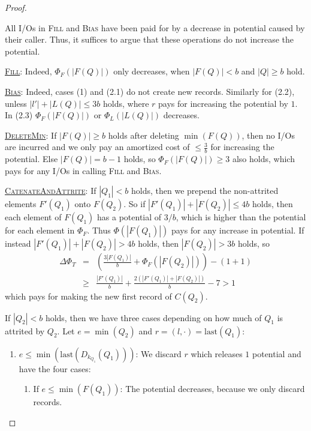 \documentclass{sig-alternate}
\newcommand{\last}{\text{last}}
\renewcommand{\(}{\left(}
\renewcommand{\)}{\right)}
\begin{document}
\begin{proof}
\begin{confenv}
All I/Os in \textsc{Fill} and \textsc{Bias} have been paid for by a decrease in
potential caused by their caller. Thus, it suffices to argue that these
operations do not increase the potential.

\noindent \underline{\textsc{Fill}}: Indeed, $\Phi_F(|F(Q)|)$ only decreases,
when $|F(Q)| < b$ and $|Q| \geq b$ hold.

\noindent \underline{\textsc{Bias}}: Indeed, cases (1) and (2.1) do not create
new records.  Similarly for (2.2), unless $|l'| + |L(Q)| \leq 3b$ holds, where
$r$ pays for increasing the potential by $1$.  In (2.3) $\Phi_F(|F(Q)|)$ or
$\Phi_L(|L(Q)|)$ decreases.
\end{confenv}
\begin{fullenv}

\noindent \underline{\textsc{DeleteMin}}: If $|F(Q)| \geq b$ holds after
deleting $\min(F(Q))$, then no I/Os are incurred and we only pay an amortized
cost of $\leq \frac{3}{b}$ for increasing the potential. Else $|F(Q)| = b-1$
holds, so $\Phi_F(|F(Q)|) \geq 3$ also holds, which pays for any I/Os in calling
\textsc{Fill} and \textsc{Bias}.

\noindent \underline{\textsc{CatenateAndAttrite}}: If $|Q_1| < b$ holds, then we
prepend the non-attrited elements $F'(Q_1)$ onto $F(Q_2)$. So if $|F'(Q_1)| +
|F(Q_2)| \leq 4b$ holds, then each element of $F(Q_1)$ has a potential of $3/b$,
which is higher than the potential for each element in $\Phi_F$. Thus
$\Phi(|F(Q_1)|)$ pays for any increase in potential. If instead $|F'(Q_1)| +
|F(Q_2)| > 4b$ holds, then $|F(Q_2)| > 3b$ holds, so
\begin{eqnarray*}
  \Delta \Phi_T
    &=&
  \( \frac{3|F(Q_1)|}{b} + \Phi_F(|F(Q_2)|) \) - \( 1+1 \) \\
    &\geq&
  \frac{|F'(Q_1)|}{b} + \frac{2(|F'(Q_1)| + |F(Q_2)|)}{b} - 7 > 1
\end{eqnarray*}
which pays for making the new first record of $C(Q_2)$.

If $|Q_2| < b$ holds, then we have three cases depending on how much of $Q_1$ is
attrited by $Q_2$. Let $e = \min(Q_2)$ and $r = (l,\cdot) = \last(Q_1)$:
\begin{enumerate}
  \item $e \leq \min(\last(D_{k_{Q_1}}(Q_1)))$: We discard $r$ which releases
    $1$ potential and have the four cases:
    \begin{enumerate}[label=\arabic*)]
      \item If $e \leq \min(F(Q_1))$:
        The potential decreases, because we only discard records.


\end{enumerate}
\end{enumerate}
\end{fullenv}
\end{proof}
\end{document}
